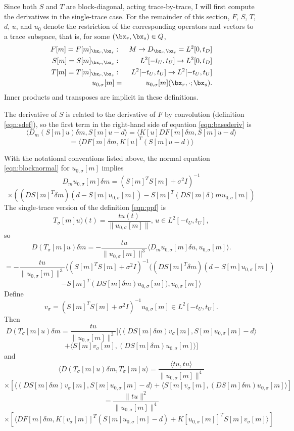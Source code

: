Since both $S$ and $T$ are block-diagonal, acting trace-by-trace, I
will first compute the derivatives in the single-trace case. For the
remainder of this section, $F$, $S$, $T$, $d$, $u$, and $u_0$ denote
the restriction of the corresponding operators and vectors to a trace subspace, that is, for some $(\bx_r,\bx_s) \in Q$,
\begin{eqnarray*}
  F[m] = F[m]_{\bx_r,\bx_s}&: & M \rightarrow D_{\bx_r,\bx_s} =
                 L^2[0,t_D] \\
  S[m] = S[m]_{\bx_r,\bx_s}&: & L^2[-t_U,t_U] \rightarrow L^2[0,t_D] \\
  T[m] = T[m]_{\bx_r,\bx_s}&: & L^2[-t_U,t_U] \rightarrow L^2[-t_U,t_U] \\
  u_{0,\sigma}[m] &=& u_{0,\sigma}[m](\bx_r,\cdot;\bx_s).
\end{eqnarray*}
Inner products and transposes are implicit in these definitions.

The derivative of $S$ is related to the derivative of $F$ by
convolution (definition \ref{eqn:sdef}), so the first term in the
right-hand side of equation \ref{eqn:basederiv} is
\[
  \langle D_m(S[m]u)\delta m, S[m]u-d \rangle = \langle
  K[u]DF[m]\delta m, S[m]u-d \rangle
\]
\begin{equation}
  \label{eqn:resderiv}
  = \langle DF[m]\delta m, K[u]^T(S[m]u-d) \rangle
\end{equation}

With the notational conventions listed above, the normal equation \ref{eqn:blocknormal} for $u_{0,\sigma}[m]$ implies
\[
  D_mu_{0,\sigma}[m] \delta m = (S[m]^TS[m] + \sigma^2I)^{-1}
\]
\begin{equation}
  \label{eqn:blockderiv}
  \times ((DS[m]^{T}\delta m) (d - S[m]u_{0,\sigma}[m]) - S[m]^T(DS[m]\delta) m u_{0,\sigma}[m])
\end{equation}
The single-trace version of the definition \ref{eqn:ppf} is
\[
  T_{\sigma}[m]u)(t) = \frac{t u(t)}{\|u_{0,\sigma}[m]\|},\,u \in L^2[-t_U,t_U],
\]
so
\[
D(T_{\sigma}[m] u)\delta m = -\frac{t u}{\|u_{0,\sigma}[m]\|^3}\langle D_mu_{0,\sigma}[m]\delta u, u_{0,\sigma}[m]\rangle.
\]
\[
  =-\frac{t u}{\|u_{0,\sigma}[m]\|^3}\langle  (S[m]^TS[m] +
  \sigma^2I)^{-1}((DS[m]^{T}\delta m) (d - S[m]u_{0,\sigma}[m])
\]
\[
   - S[m]^T(DS[m]\delta m) u_{0,\sigma}[m]), u_{0,\sigma}[m] \rangle
\]
Define
\begin{equation}
  \label{eqn:defvsigma}
  v_{\sigma} = (S[m]^TS[m]+ \sigma^2I)^{-1} u_{0,\sigma}[m] \in
  L^2[-t_U,t_U].
\end{equation}
Then
\[
  D(T_{\sigma}[m] u)\delta m =
  \frac{t u}{\|u_{0,\sigma}[m]\|^3}[\langle (DS[m]\delta
  m)v_{\sigma}[m], S[m]u_{0,\sigma}[m]-d\rangle
\]
\[+
  \langle S[m]v_{\sigma}[m], (DS[m]\delta m) u_{0,\sigma}[m] \rangle ]
\]
and
\[
  \langle D(T_{\sigma}[m]u)\delta m, T_{\sigma}[m]u\rangle =
\frac{\langle t u, tu \rangle}{\|u_{0,\sigma}[m]\|^4}
\]
\[
\times [\langle (DS[m]\delta
  m)v_{\sigma}[m], S[m]u_{0,\sigma}[m]-d\rangle
+
  \langle S[m]v_{\sigma}[m], (DS[m]\delta m) u_{0,\sigma}[m] \rangle ]
\]
\[
  = \frac {\|t u\|^2}{\|u_{0,\sigma}[m]\|^4}
\]
\[
  \times [\langle DF[m]\delta m, K[v_{\sigma}[m]]^T(S[m]u_{0,\sigma}[m]-d)
+
K[u_{0,\sigma}[m]]^T S[m]v_{\sigma}[m]\rangle ]
\]

